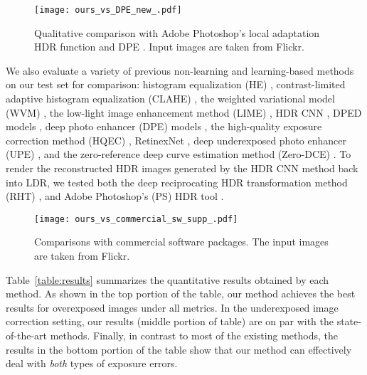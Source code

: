 \documentclass[final]{cvpr}
\begin{document}
\begin{figure}[t]
\centering
\texttt{[image: ours\_vs\_DPE\_new\_.pdf]}
\vspace{-6mm}
\caption{Qualitative comparison with Adobe Photoshop's local adaptation HDR function \cite{dayley2010photoshop} and DPE \cite{DPE}. Input images are taken from Flickr.\vspace{-4mm}} 
\label{fig:ours_vs_commercial_sw}
\end{figure}

We also evaluate a variety of previous non-learning and learning-based methods on our test set for comparison: histogram equalization (HE) \cite{10.5555/559707}, contrast-limited adaptive histogram equalization (CLAHE) \cite{adaptivehisteq}, the weighted variational model (WVM) \cite{fu2016weighted}, the low-light image enhancement method (LIME) \cite{guo2016lime, guo2017lime}, HDR CNN \cite{HDRCNN},  DPED models \cite{DPED},  deep photo enhancer (DPE) models \cite{DPE}, the high-quality exposure correction method (HQEC) \cite{HQEC}, RetinexNet \cite{Chen2018Retinex}, deep underexposed photo enhancer (UPE) \cite{DeepUPE}, and the zero-reference deep curve estimation method (Zero-DCE) \cite{guo2020zero}. To render the reconstructed HDR images generated by the HDR CNN method \cite{HDRCNN} back into LDR, we tested both the deep reciprocating HDR transformation method (RHT) \cite{yang2018image}, and Adobe Photoshop's (PS) HDR tool \cite{dayley2010photoshop}.


\begin{figure}
\centering
\texttt{[image: ours\_vs\_commercial\_sw\_supp\_.pdf]}
\vspace{-6mm}
\caption{Comparisons with commercial software packages. 
The input images are taken from Flickr.\vspace{-6mm}}
\label{fig:ours_vs_commercial_sw_supp}
\end{figure}



Table\ \ref{table:results} summarizes the quantitative results obtained by each method. As shown in the top portion of the table, our method achieves the best results for overexposed images under
all metrics. In the underexposed image correction setting,
our results (middle portion of table) are on par with the state-of-the-art methods. Finally, in contrast to most of the existing methods, the results in the bottom portion of the table show that our method can effectively deal with \textit{both} types of exposure errors.
\end{document}
